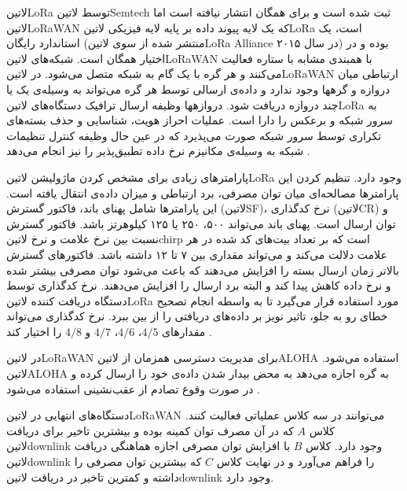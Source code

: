 ‌لاتین{LoRa} توسط ‌لاتین{Semtech} ثبت شده است و برای همگان انتشار نیافته است اما ‌لاتین{LoRaWAN} که یک لایه پیوند داده بر پایه لایه فیزیکی ‌لاتین{LoRa}
است، یک استاندارد رایگان (منتشر شده از سوی ‌لاتین{LoRa Alliance} در سال ۲۰۱۵) بوده و در اختیار همگان است.
شبکه‌های ‌لاتین{LoRaWAN} با همبندی مشابه با ستاره فعالیت می‌کنند و هر گره با یک گام به شبکه متصل می‌شود.
در ‌لاتین{LoRaWAN} ارتباطی میان دروازه و گرهها وجود ندارد و داده‌ی ارسالی توسط هر گره می‌تواند به وسیله‌ی یک یا چند دروازه دریافت شود.
دروازهها وظیفه ارسال ترافیک دستگاه‌های ‌لاتین{LoRa} به سرور شبکه و برعکس را دارا است.
عملیات احراز هویت، شناسایی و حذف بسته‌های تکراری توسط سرور شبکه صورت می‌پذیرد که در عین حال وظیفه کنترل
تنظیمات شبکه به وسیله‌ی مکانیزم نرخ داده تطبیق‌پذیر را نیز انجام می‌دهد .

پارامترهای زیادی برای مشخص کردن ماژولیشن ‌لاتین{LoRa} وجود دارد. تنظیم کردن این پارامترها
مصالحه‌ای میان توان مصرفی، برد ارتباطی و میزان داده‌ی انتقال یافته است.
این پارامترها شامل پهنای باند، فاکتور گسترش (‌لاتین{SF})، نرخ کدگذاری (‌لاتین{CR}) و توان ارسال است.
پهنای باند می‌تواند ۵۰۰، ۲۵۰ یا ۱۲۵ کیلوهرتز باشد.
فاکتور گسترش نسبت بین نرخ علامت و نرخ ‌لاتین{chirp} است که بر تعداد بیت‌های کد شده در هر علامت دلالت می‌کند و می‌تواند مقداری بین ۷ تا ۱۲ داشته باشد.
فاکتورهای گسترش بالاتر زمان ارسال بسته را افزایش می‌دهند که باعث می‌شود توان مصرفی بیشتر شده و نرخ داده کاهش پیدا کند و البته برد ارسال را افزایش می‌دهند.
نرخ کدگذاری توسط دستگاه دریافت کننده ‌لاتین{LoRa} مورد استفاده قرار می‌گیرد تا به واسطه انجام تصحیح خطای رو به جلو، تاثیر نویز بر داده‌های دریافتی را از بین ببرد.
نرخ کدگذاری می‌تواند مقدارهای $4/5$، $4/6$، $4/7$ و $4/8$ را اختیار کند
.

در ‌لاتین{LoRaWAN} برای مدیریت دسترسی همزمان از ‌لاتین{ALOHA} استفاده می‌شود.
‌لاتین{ALOHA} به گره اجازه می‌دهد به محض بیدار شدن داده‌ی خود را ارسال کرده و در صورت وقوع تصادم
از عقب‌نشینی استفاده می‌شود
.

دستگاه‌های انتهایی در ‌لاتین{LoRaWAN} می‌توانند در سه کلاس عملیاتی فعالیت کنند. کلاس $A$ که در آن مصرف توان کمینه بوده و بیشترین تاخیر
برای دریافت ‌لاتین{downlink} وجود دارد. کلاس $B$ با افزایش توان مصرفی اجازه هماهنگی دریافت ‌لاتین{downlink} را فراهم می‌آورد
و در نهایت کلاس $C$ که بیشترین توان مصرفی را داشته و کمترین تاخیر در دریافت ‌لاتین{downlink} وجود دارد.

